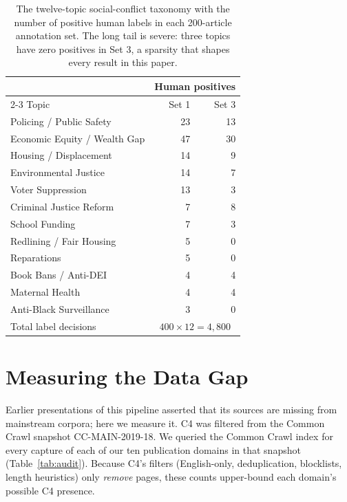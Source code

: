 \documentclass[letterpaper]{article}
\begin{document}
\begin{table}[t]
\centering
\small
\begin{tabular}{lrr}
\toprule
& \multicolumn{2}{c}{Human positives} \\
\cmidrule(lr){2-3}
Topic & Set 1 & Set 3 \\
\midrule
Policing / Public Safety        & 23 & 13 \\
Economic Equity / Wealth Gap    & 47 & 30 \\
Housing / Displacement          & 14 &  9 \\
Environmental Justice           & 14 &  7 \\
Voter Suppression               & 13 &  3 \\
Criminal Justice Reform         &  7 &  8 \\
School Funding                  &  7 &  3 \\
Redlining / Fair Housing        &  5 &  0 \\
Reparations                     &  5 &  0 \\
Book Bans / Anti-DEI            &  4 &  4 \\
Maternal Health                 &  4 &  4 \\
Anti-Black Surveillance         &  3 &  0 \\
\midrule
Total label decisions           & \multicolumn{2}{c}{$400 \times 12 = 4{,}800$} \\
\bottomrule
\end{tabular}
\caption{The twelve-topic social-conflict taxonomy with the number of
positive human labels in each 200-article annotation set. The long tail
is severe: three topics have zero positives in Set 3, a sparsity that
shapes every result in this paper.}
\label{tab:taxonomy}
\end{table}

\section{Measuring the Data Gap}
\label{sec:gap}

Earlier presentations of this pipeline asserted that its sources are
missing from mainstream corpora; here we measure it. C4
\citep{raffel2020} was filtered from the Common Crawl snapshot
CC-MAIN-2019-18. We queried the Common Crawl index for every capture of
each of our ten publication domains in that snapshot
(Table~\ref{tab:audit}). Because C4's filters (English-only,
deduplication, blocklists, length heuristics) only \emph{remove} pages,
these counts upper-bound each domain's possible C4 presence.
\end{document}

